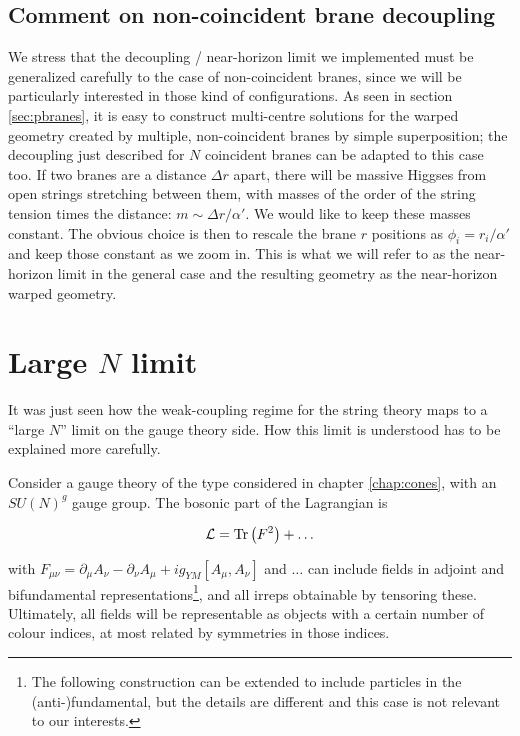 \subsection{Comment on non-coincident brane decoupling}

We stress that the decoupling / near-horizon limit we implemented must be generalized carefully to the case of non-coincident branes, since we will be particularly interested in those kind of configurations. As seen in section \ref{sec:pbranes}, it is easy to construct multi-centre solutions for the warped geometry created by multiple, non-coincident branes by simple superposition; the decoupling just described for $N$ coincident branes can be adapted to this case too. If two branes are a distance $\Delta r$ apart, there will be massive Higgses from open strings stretching between them, with masses of the order of the string tension times the distance: $m \sim \Delta r / \alpha'$. We would like to keep these masses constant. The obvious choice is then to rescale the brane $r$ positions as $\phi_i = r_i / \alpha'$ and keep those constant as we zoom in. This is what we will refer to as the near-horizon limit in the general case and the resulting geometry as the near-horizon warped geometry.\\

\section{Large $N$ limit}

It was just seen how the weak-coupling regime for the string theory maps to a ``large $N$'' limit on the gauge theory side. How this limit is understood has to be explained more carefully.

Consider a gauge theory of the type considered in chapter \ref{chap:cones}, with an $SU(N)^g$ gauge group. The bosonic part of the Lagrangian is

\begin{equation}
\mathcal{L} = \operatorname{Tr} \left(F^2\right) + \ldots 
\end{equation}

with $F_{\mu\nu} = \partial_\mu A_\nu - \partial_\nu A_\mu + i g_{YM} [A_\mu,A_\nu]$ and $\ldots$ can include fields in adjoint and bifundamental representations\footnote{The following construction can be extended to include particles in the (anti-)fundamental, but the details are different and this case is not relevant to our interests.}, and all irreps obtainable by tensoring these. Ultimately, all fields will be representable as objects with a certain number of colour indices, at most related by symmetries in those indices.

